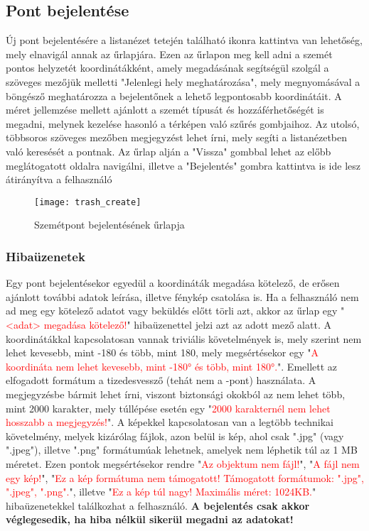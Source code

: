 \subsection{Pont bejelentése}

Új pont bejelentésére a listanézet tetején található  ikonra kattintva van lehetőség, mely elnavigál annak az űrlapjára. Ezen az űrlapon meg kell adni a szemét pontos helyzetét koordinátákként, amely megadásának segítségül szolgál a szöveges mezőjük melletti "Jelenlegi hely meghatározása", mely megnyomásával a böngésző meghatározza a bejelentőnek a lehető legpontosabb koordinátáit. A méret jellemzése mellett ajánlott a szemét típusát és hozzáférhetőségét is megadni, melynek kezelése hasonló a térképen való szűrés gombjaihoz. Az utolsó, többsoros szöveges mezőben megjegyzést lehet írni, mely segíti a listanézetben való keresését a pontnak. Az űrlap alján a "Vissza" gombbal lehet az előbb meglátogatott oldalra navigálni, illetve a "Bejelentés" gombra kattintva is ide lesz átirányítva a felhasználó

\begin{figure}[H]
	\centering
	\texttt{[image: trash\_create]}
	\caption{Szemétpont bejelentésének űrlapja}
	\label{fig:trash_create}
\end{figure}

\subsubsection{Hibaüzenetek}
\label{subsubsec:trash_create_errors}

Egy pont bejelentésekor egyedül a koordináták megadása kötelező, de erősen ajánlott további adatok leírása, illetve fénykép csatolása is. Ha a felhasználó nem ad meg egy kötelező adatot vagy beküldés előtt törli azt, akkor az űrlap egy "\textcolor{red}{<adat> megadása kötelező!}" hibaüzenettel jelzi azt az adott mező alatt. A koordinátákkal kapcsolatosan vannak triviális követelmények is, mely szerint nem lehet kevesebb, mint -180 és több, mint 180, mely megsértésekor egy "\textcolor{red}{A koordináta nem lehet kevesebb, mint -180° és több, mint 180°.}". Emellett az elfogadott formátum a tizedesvessző (tehát nem a -pont) használata. A megjegyzésbe bármit lehet írni, viszont biztonsági okokból az nem lehet több, mint 2000 karakter, mely túllépése esetén egy "\textcolor{red}{2000 karakternél nem lehet hosszabb a megjegyzés!}". A képekkel kapcsolatosan van a legtöbb technikai követelmény, melyek kizárólag fájlok, azon belül is kép, ahol csak ".jpg" (vagy ".jpeg"), illetve ".png" formátumúak lehetnek, amelyek nem léphetik túl az 1 MB méretet. Ezen pontok megsértésekor rendre "\textcolor{red}{Az objektum nem fájl!}", "\textcolor{red}{A fájl nem egy kép!}", "\textcolor{red}{Ez a kép formátuma nem támogatott! Támogatott formátumok: ".jpg", ".jpeg", ".png".}", illetve "\textcolor{red}{Ez a kép túl nagy! Maximális méret: 1024KB.}" hibaüzenetekkel találkozhat a felhasználó. \textbf{A bejelentés csak akkor véglegesedik, ha hiba nélkül sikerül megadni az adatokat!}

